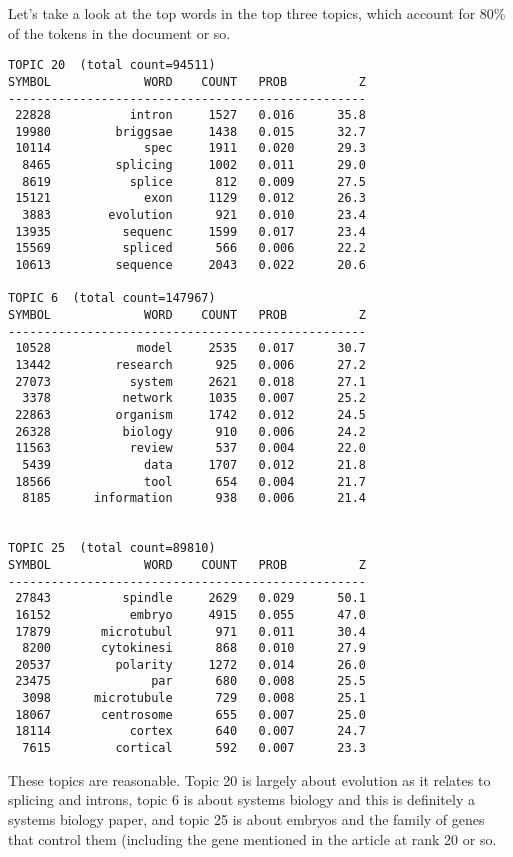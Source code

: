 Let's take a look at the top words in the top three topics, which
account for 80\% of the tokens in the document or so.
%
\begin{verbatim}
TOPIC 20  (total count=94511)
SYMBOL             WORD    COUNT   PROB          Z
--------------------------------------------------
 22828           intron     1527   0.016      35.8
 19980         briggsae     1438   0.015      32.7
 10114             spec     1911   0.020      29.3
  8465         splicing     1002   0.011      29.0
  8619           splice      812   0.009      27.5
 15121             exon     1129   0.012      26.3
  3883        evolution      921   0.010      23.4
 13935          sequenc     1599   0.017      23.4
 15569          spliced      566   0.006      22.2
 10613         sequence     2043   0.022      20.6

TOPIC 6  (total count=147967)
SYMBOL             WORD    COUNT   PROB          Z
--------------------------------------------------
 10528            model     2535   0.017      30.7
 13442         research      925   0.006      27.2
 27073           system     2621   0.018      27.1
  3378          network     1035   0.007      25.2
 22863         organism     1742   0.012      24.5
 26328          biology      910   0.006      24.2
 11563           review      537   0.004      22.0
  5439             data     1707   0.012      21.8
 18566             tool      654   0.004      21.7
  8185      information      938   0.006      21.4


TOPIC 25  (total count=89810)
SYMBOL             WORD    COUNT   PROB          Z
--------------------------------------------------
 27843          spindle     2629   0.029      50.1
 16152           embryo     4915   0.055      47.0
 17879       microtubul      971   0.011      30.4
  8200       cytokinesi      868   0.010      27.9
 20537         polarity     1272   0.014      26.0
 23475              par      680   0.008      25.5
  3098      microtubule      729   0.008      25.1
 18067       centrosome      655   0.007      25.0
 18114           cortex      640   0.007      24.7
  7615         cortical      592   0.007      23.3
\end{verbatim}
%
These topics are reasonable.  Topic 20 is largely about evolution as
it relates to splicing and introns, topic 6 is about systems biology
and this is definitely a systems biology paper, and topic 25 is about
embryos and the family of  genes that control them
(including the gene  mentioned in the article at
rank 20 or so.

